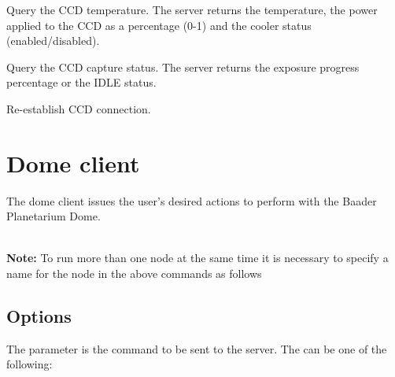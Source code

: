 \documentclass[a4paper,english]{article}
\begin{document}
\begin{Description}
\item[\Arg{gettemp}] Query the CCD temperature. The server returns the temperature, the power applied to the CCD as a percentage (0-1) and the cooler status (enabled/disabled).

	   
	
\item[\Arg{getcapstatus}] Query the CCD capture status. The server returns the exposure progress percentage or the IDLE status.

	   
	
\item[\Arg{reconnect}] Re-establish CCD connection.

	   
	
\end{Description}


\section{Dome client}

The dome client issues the user's desired actions to perform with the Baader Planetarium Dome. \\

   

    \\

\textbf{Note:} To run more than one  node at the same time it is necessary to specify a name for the node in the above commands as follows 


\subsection{Options}

The  parameter is the command to be sent to the server. The  can be one of the following:
\end{document}
